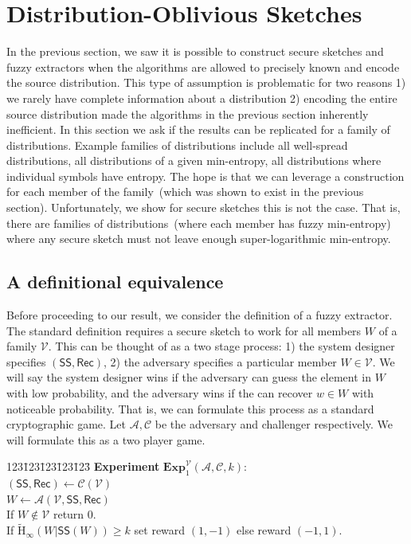 \documentclass[11pt]{article}
\newcommand{\class}[1]{{\ensuremath{\mathsf{#1}}}}
\newcommand{\sketch}{\ensuremath{\class{SS}}\xspace}
\newcommand{\rec}{\ensuremath{\class{Rec}}\xspace}
\newcommand{\Hav}{\tilde{\mathrm{H}}_\infty}
\newcommand{\Exp}{\mathbf{Exp}}
\begin{document}
\section{Distribution-Oblivious Sketches}
\label{sec:dist oblivious}

In the previous section, we saw it is possible to construct secure sketches and fuzzy extractors when the algorithms are allowed to precisely known and encode the source distribution.  This type of assumption is problematic for two reasons 1) we rarely have complete information about a distribution 2) encoding the entire source distribution made the algorithms in the previous section inherently inefficient.  In this section we ask if the results can be replicated for a family of distributions.  Example families of distributions include all well-spread distributions, all distributions of a given min-entropy, all distributions where individual symbols have entropy.  The hope is that we can leverage a construction for each member of the family~(which was shown to exist in the previous section).  Unfortunately, we show for secure sketches this is not the case.  That is, there are families of distributions~(where each member has fuzzy min-entropy) where any secure sketch must not leave enough super-logarithmic min-entropy.

\subsection{A definitional equivalence}
Before proceeding to our result, we consider the definition of a fuzzy extractor.  The standard definition requires a secure sketch to work for all members $W$ of a family $\mathcal{V}$.  This can be thought of as a two stage process: 1) the system designer specifies $(\sketch, \rec)$, 2) the adversary specifies a particular member $W\in \mathcal{V}$.  We will say the system designer wins if the adversary can guess the element in $W$ with low probability, and the adversary wins if the can recover $w\in W$ with noticeable probability.  That is, we can formulate this process as a standard cryptographic game.  Let $\mathcal{A}, \mathcal{C}$ be the adversary and challenger respectively. We will formulate this as a two player game.

\begin{center}
\begin{minipage}{1in}
\begin{tabbing}
123\=123\=123\=123\=123\=\kill
\textbf{Experiment} $\Exp^{\mathcal{V}}_1(\mathcal{A}, \mathcal{C}, k)$: \\
$(\sketch, \rec)\leftarrow \mathcal{C}(\mathcal{V})$\\
$W \leftarrow \mathcal{A}(\mathcal{V}, \sketch, \rec)$\\
If $W\not\in \mathcal{V}$ return $0$.\\
If $\Hav(W | \sketch(W))\ge k$ set reward $(1, -1)$ else reward $(-1, 1)$.
\end{tabbing} \end{minipage} 
\end{center}
\end{document}
